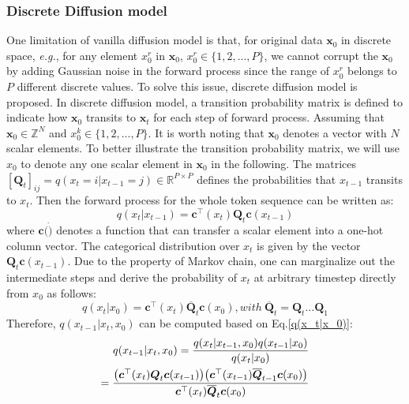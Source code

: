 \documentclass[lettersize,journal]{IEEEtran}
\begin{document}
\subsubsection{Discrete Diffusion model} \label{bkg:ddm}
One limitation of vanilla diffusion model is that, for original data $\boldsymbol{x}_0$ in discrete space, \textit{e.g.}, for any element $x_0^r$ in $\boldsymbol{x}_0$, $x_0^r \in \{1, 2, ..., P\}$, we cannot  corrupt the $\boldsymbol{x}_0$ by adding Gaussian noise in the forward process since the range of $x_0^r$ belongs to $P$ different discrete values. To solve this issue, discrete diffusion model \cite{sohl2015deep,austin2021structured} is proposed.
In discrete diffusion model, a transition probability matrix is defined to indicate how $\boldsymbol{x}_0$ transits to $\boldsymbol{x}_t$ for each step of forward process. Assuming that $\boldsymbol{x}_0 \in \mathbb{Z}^N$ and $x_{0}^{k} \in \{1, 2, ..., P\}$. It is worth noting that $\boldsymbol{x}_0$ denotes a vector with $N$ scalar elements. {\color{black}To better illustrate the transition probability matrix, we will use $x_0$ to denote any one scalar element in $\boldsymbol{x}_0$ in the following.} The matrices $[\boldsymbol{Q}_t]_{ij}=q(x_t=i|x_{t-1}=j) \in \mathbb{R}^{P \times P}$ defines the probabilities that $x_{t-1}$ transits to $x_t$. Then the forward process for the whole token sequence can be written as:
\begin{equation}\label{discrete forward process}
     q(x_t|x_{t-1})=\boldsymbol{c}^\top(x_t) \boldsymbol{Q}_t \boldsymbol{c}(x_{t-1})
\end{equation}
where $\boldsymbol{c}(\dot)$ denotes a function that can transfer a scalar element into a one-hot column vector. 
The categorical distribution over $x_t$ is given by the vector $\boldsymbol{Q}_t \boldsymbol{c}(x_{t-1})$. 
{\color{black} Due to the property of Markov chain}, one can marginalize out the intermediate steps and derive the probability of $x_t$ at arbitrary timestep directly from $x_0$ as follows:
\begin{equation}\label{q(x_t|x_0)}
    q(x_t|x_{0})=\boldsymbol{c}^\top(x_t) \overline{\boldsymbol{Q}}_t \boldsymbol{c}(x_{0}), \mathit{with} \ \overline{\boldsymbol{Q}}_t= \boldsymbol{Q}_t \dots \boldsymbol{Q}_1
\end{equation}
Therefore, $q(x_{t-1}|x_{t},x_{0})$ can be computed based on Eq.\ref{q(x_t|x_0)}:
\begin{equation}\label{post}
\begin{aligned}
    q(x_{t-1}|x_{t},x_{0})= \frac{q(x_t|x_{t-1},x_0)q(x_{t-1}|x_0)}{q(x_t|x_0)} \\
    = \frac{\big{(}\boldsymbol{c}^\top(x_t) \boldsymbol{Q}_t \boldsymbol{c}(x_{t-1}) \big{)} \big{(}\boldsymbol{c}^\top(x_{t-1}) \overline{\boldsymbol{Q}}_{t-1} \boldsymbol{c}(x_0) \big{)}}{\boldsymbol{c}^\top(x_t) \overline{\boldsymbol{Q}}_t \boldsymbol{c}(x_0)}
\end{aligned}
\end{equation}
\end{document}
